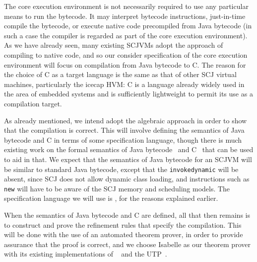 \documentclass[a4paper,10pt]{report}
\begin{document}
The core execution environment is not necessarily required to use any particular
means to run the bytecode.  It may interpret bytecode instructions, just-in-time
compile the bytecode, or execute native code precompiled from Java bytecode (in
such a case the compiler is regarded as part of the core execution environment).
As we have already seen, many existing SCJVMs adopt the approach of compiling to
native code, and so our consider specification of the core execution environment
will focus on compilation from Java bytecode to C. The reason for the choice of
C as a target language is the same as that of other SCJ virtual machines,
particularly the icecap HVM: C is a language already widely used in the area of
embedded systems and is sufficiently lightweight to permit its use as a
compilation target.

As already mentioned, we intend adopt the algebraic approach in order to show
that the compilation is correct.  This will involve defining the semantics of
Java bytecode and C in terms of some specification language, though there is
much existing work on the formal semantics of Java bytecode~\cite{bertelsen2000,
  jones1998, stark2001, alves1999a, bogdanas2015, lochbihler2012a} and
C~\cite{campbell2012, ellison2012, krebbers2014} that can be used to aid in
that.  We expect that the semantics of Java bytecode for an SCJVM will be
similar to standard Java bytecode, except that the \texttt{invokedynamic} will
be absent, since SCJ does not allow dynamic class loading, and instructions such
as \texttt{new} will have to be aware of the SCJ memory and scheduling models.
The specification language we will use is \Circus{}, for the reasons explained
earlier.

When the semantics of Java bytecode and C are defined, all that then remains is
to construct and prove the refinement rules that specify the compilation.  This
will be done with the use of an automated theorem prover, in order to provide
assurance that the proof is correct, and we choose Isabelle as our theorem
prover with its existing implementations of \Circus{}~\cite{joshi2012} and the
UTP~\cite{foster2015}.
\end{document}
